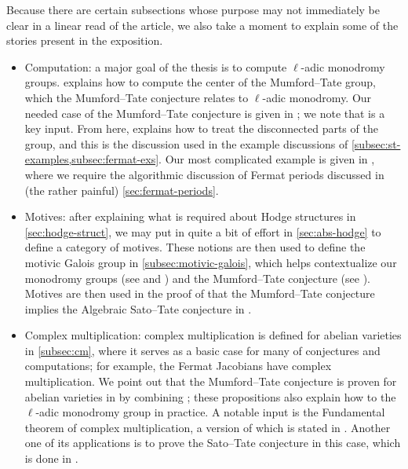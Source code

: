 \documentclass[openany]{book}
\begin{document}
Because there are certain subsections whose purpose may not immediately be clear in a linear read of the article, we also take a moment to explain some of the stories present in the exposition.
\begin{itemize}
	\item Computation: a major goal of the thesis is to compute $\ell$-adic monodromy groups.  explains how to compute the center of the Mumford--Tate group, which the Mumford--Tate conjecture relates to $\ell$-adic monodromy. Our needed case of the Mumford--Tate conjecture is given in ; we note that  is a key input. From here,  explains how to treat the disconnected parts of the group, and this is the discussion used in the example discussions of \cref{subsec:st-examples,subsec:fermat-exs}. Our most complicated example is given in , where we require the algorithmic discussion of Fermat periods discussed in (the rather painful) \cref{sec:fermat-periods}.
	\item Motives: after explaining what is required about Hodge structures in \cref{sec:hodge-struct}, we may put in quite a bit of effort in \cref{sec:abs-hodge} to define a category of motives. These notions are then used to define the motivic Galois group in \cref{subsec:motivic-galois}, which helps contextualize our monodromy groups (see  and ) and the Mumford--Tate conjecture (see ). Motives are then used in the proof of that the Mumford--Tate conjecture implies the Algebraic Sato--Tate conjecture in .
	\item Complex multiplication: complex multiplication is defined for abelian varieties in \cref{subsec:cm}, where it serves as a basic case for many of conjectures and computations; for example, the Fermat Jacobians have complex multiplication. We point out that the Mumford--Tate conjecture is proven for abelian varieties in  by combining ; these propositions also explain how to the $\ell$-adic monodromy group in practice. A notable input is the Fundamental theorem of complex multiplication, a version of which is stated in . Another one of its applications is to prove the Sato--Tate conjecture in this case, which is done in .
\end{itemize}
\end{document}
